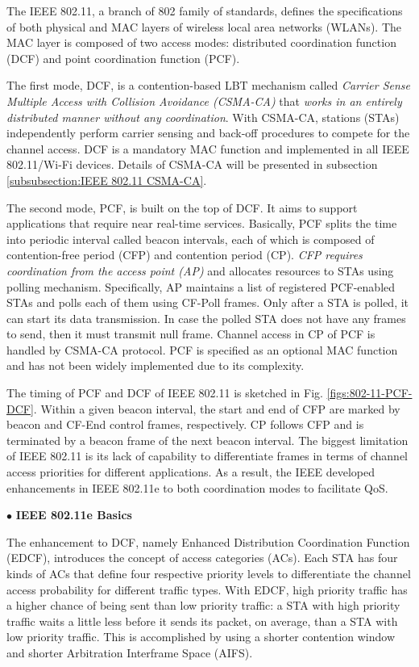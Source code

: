 \documentclass[journal,draftclsnofoot,12pt,onecolumn]{IEEEtran}
\begin{document}
\noindent The IEEE 802.11, a branch of 802 family of standards, defines the specifications of both physical and MAC layers of wireless local area networks (WLANs). The MAC layer is composed of two access modes: distributed coordination function (DCF) and point coordination function (PCF).

The first mode, DCF, is a contention-based LBT mechanism called \textit{Carrier Sense Multiple Access with Collision Avoidance (CSMA-CA)} that \textit{works in an entirely distributed manner without any coordination}. With CSMA-CA, stations (STAs) independently perform carrier sensing and back-off procedures to compete for the channel access. DCF is a mandatory MAC function and implemented in all IEEE 802.11/Wi-Fi devices. Details of CSMA-CA will be presented in subsection \ref{subsubsection:IEEE 802.11 CSMA-CA}.

The second mode, PCF, is built on the top of DCF. It aims to support applications that require near real-time services. Basically, PCF splits the time into periodic interval called beacon intervals, each of which is composed of contention-free period (CFP) and contention period (CP). \textit{CFP requires coordination from the access point (AP)} and allocates resources to STAs using polling mechanism. Specifically, AP maintains a list of registered PCF-enabled STAs and polls each of them using CF-Poll frames. Only after a STA is polled, it can start its data transmission. In case the polled STA does not have any frames to send, then it must transmit null frame. Channel access in CP of PCF is handled by CSMA-CA protocol. PCF is specified as an optional MAC function and has not been widely implemented due to its complexity.

The timing of PCF and DCF of IEEE 802.11 is sketched in Fig. \ref{figs:802-11-PCF-DCF}. Within a given beacon interval, the start and end of CFP are marked by beacon and CF-End control frames, respectively. CP follows CFP and is terminated by a beacon frame of the next beacon interval. The biggest limitation of IEEE 802.11 is its lack of capability to differentiate frames in terms of channel access priorities for different applications. As a result, the IEEE developed enhancements in IEEE 802.11e to both coordination modes to facilitate QoS.

\vspace{3mm}
\noindent $\bullet$ \textbf{IEEE 802.11e Basics}
\vspace{3mm}

\noindent The enhancement to DCF, namely Enhanced Distribution Coordination Function (EDCF), introduces the concept of
access categories (ACs). Each STA has four kinds of ACs that define four respective priority levels to differentiate the channel access probability for different traffic types. With EDCF, high priority traffic has a higher chance of being sent than low priority traffic: a STA with high priority traffic waits a little less before it sends its packet, on average, than a STA with low priority traffic. This is accomplished by using a shorter contention window and shorter Arbitration Interframe Space (AIFS).
\end{document}

